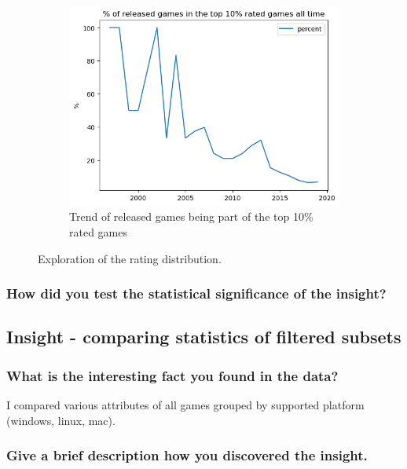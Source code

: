 \documentclass[11pt]{article}
\begin{document}
\begin{figure}
\begin{subfigure}[b]{0.475\textwidth}
        \centering
        \includegraphics[width=1\textwidth]{graphics/insight2_graph3.png}
        \caption{Trend of released games being part of the top 10\% rated games}
        \label{fig:insight2_3}
    \end{subfigure}
    \label{fig:insight2}
    \caption{Exploration of the rating distribution.}
\end{figure}



\subsubsection{How did you test the statistical significance of the insight?}

\subsection{Insight - comparing statistics of filtered subsets}

\subsubsection{What is the interesting fact you found in the data?}

I compared various attributes of all games grouped by supported platform (windows, linux, mac). 

\subsubsection{Give a brief description how you discovered the
insight.}
\end{document}
